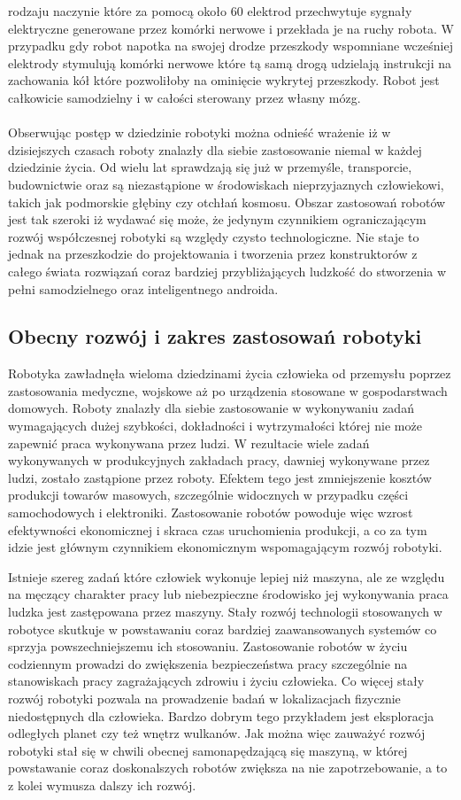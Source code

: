 rodzaju naczynie które za pomocą około 60 elektrod przechwytuje sygnały
elektryczne generowane przez komórki nerwowe i przekłada je na ruchy robota. W
przypadku gdy robot napotka na swojej drodze przeszkody wspomniane
wcześniej elektrody stymulują komórki nerwowe które tą samą drogą udzielają
instrukcji na zachowania kół które pozwoliłoby na ominięcie wykrytej przeszkody. Robot jest
całkowicie samodzielny i w całości sterowany przez własny mózg.\\
\\
Obserwując postęp w dziedzinie robotyki można odnieść wrażenie iż w dzisiejszych
czasach roboty znalazły dla siebie zastosowanie niemal w każdej dziedzinie życia.
Od wielu lat sprawdzają się już w przemyśle, transporcie, budownictwie oraz są
niezastąpione w środowiskach nieprzyjaznych człowiekowi, takich jak podmorskie
głębiny czy otchłań kosmosu. Obszar zastosowań robotów jest tak szeroki iż
wydawać się może, że jedynym czynnikiem ograniczającym rozwój współczesnej
robotyki są względy czysto technologiczne. Nie staje to jednak na przeszkodzie do
projektowania i tworzenia przez konstruktorów z całego świata rozwiązań coraz
bardziej przybliżających ludzkość do stworzenia w pełni samodzielnego oraz
inteligentnego androida.
\subsection{Obecny rozwój i zakres zastosowań robotyki}
Robotyka zawładnęła wieloma dziedzinami życia człowieka od przemysłu poprzez
zastosowania medyczne, wojskowe aż po urządzenia stosowane w gospodarstwach
domowych. Roboty znalazły dla siebie zastosowanie w wykonywaniu zadań
wymagających dużej szybkości, dokładności i wytrzymałości której nie może
zapewnić praca wykonywana przez ludzi. W rezultacie wiele zadań wykonywanych w
produkcyjnych zakładach pracy, dawniej wykonywane przez ludzi, zostało zastąpione
przez roboty. Efektem tego jest zmniejszenie kosztów produkcji towarów masowych,
szczególnie widocznych w przypadku części samochodowych i elektroniki.
Zastosowanie robotów powoduje więc wzrost efektywności ekonomicznej i skraca czas
uruchomienia produkcji, a co za tym idzie jest głównym czynnikiem ekonomicznym wspomagającym rozwój robotyki.

Istnieje szereg zadań które człowiek wykonuje lepiej niż maszyna,
ale ze względu na męczący charakter pracy lub niebezpieczne środowisko jej wykonywania praca
ludzka jest zastępowana przez maszyny. Stały rozwój technologii stosowanych w
robotyce skutkuje w powstawaniu coraz bardziej zaawansowanych systemów co sprzyja
powszechniejszemu ich stosowaniu. Zastosowanie robotów w życiu codziennym
prowadzi do zwiększenia bezpieczeństwa pracy szczególnie na stanowiskach pracy
zagrażających zdrowiu i życiu człowieka. Co więcej stały rozwój robotyki pozwala
na prowadzenie badań w lokalizacjach fizycznie niedostępnych dla człowieka.
Bardzo dobrym tego przykładem jest eksploracja odległych planet czy też wnętrz
wulkanów. Jak można więc zauważyć rozwój robotyki stał się w chwili obecnej
samonapędzającą się maszyną, w której powstawanie coraz doskonalszych robotów
zwiększa na nie zapotrzebowanie, a to z kolei wymusza dalszy ich rozwój.
